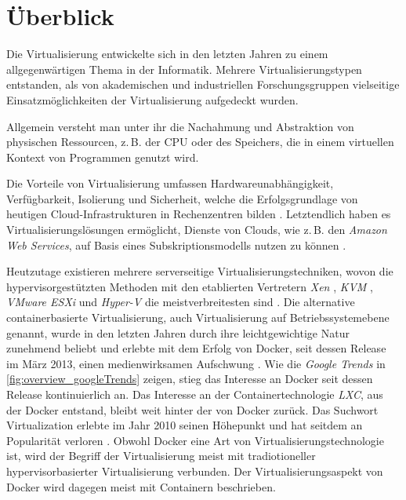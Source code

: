 \documentclass[../main.tex]{subfiles}
\begin{document}
\chapter{Überblick}
\label{overview}
  Die Virtualisierung entwickelte sich in den letzten Jahren zu einem allgegenwärtigen Thema in der Informatik. Mehrere Virtualisierungstypen entstanden, als von akademischen und industriellen Forschungsgruppen vielseitige Einsatzmöglichkeiten der Virtualisierung aufgedeckt wurden.

  Allgemein versteht man unter ihr die Nachahmung und Abstraktion von physischen Ressourcen, z.\,B. der \acrshort{CPU} oder des Speichers, die in einem virtuellen Kontext von Programmen genutzt wird.

  Die Vorteile von Virtualisierung umfassen Hardwareunabhängigkeit, Verfügbarkeit, Isolierung und Sicherheit, welche die Erfolgsgrundlage von heutigen \gls{Cloud}-Infrastrukturen in Rechenzentren bilden \cite[S.1]{containerVirtPerformance}.
  Letztendlich haben es Virtualisierungslösungen ermöglicht, Dienste von Clouds, wie z.\,B. den \emph{Amazon Web Services}\cite{amazonWebServices}, auf Basis eines Subskriptionsmodells nutzen zu können \cite[S.1]{dockerSec1}.

  Heutzutage existieren mehrere serverseitige Virtualisierungstechniken, wovon die hypervisorgestützten Methoden mit den etablierten Vertretern \emph{Xen} \cite{xen}, \emph{KVM} \cite{kvm}, \emph{VMware ESXi} \cite{vmwareESXi} und \emph{Hyper-V} \cite{hyperv} die meistverbreitesten sind \cite[S.2]{containerVirtPerformance}. Die alternative containerbasierte Virtualisierung, auch Virtualisierung auf Betriebssystemebene genannt, wurde in den letzten Jahren durch ihre leichtgewichtige Natur zunehmend beliebt und erlebte mit dem Erfolg von Docker, seit dessen Release im März 2013, einen medienwirksamen Aufschwung \cite{githubDockerChangelog}. Wie die \emph{Google Trends} in \fig \ref{fig:overview_googleTrends} zeigen, stieg das Interesse an Docker seit dessen Release kontinuierlich an. Das Interesse an der Containertechnologie \emph{\acrshort{LXC}}, aus der Docker entstand, bleibt weit hinter der von Docker zurück. Das Suchwort \glqq{}Virtualization\grqq{} erlebte im Jahr 2010 seinen Höhepunkt und hat seitdem an Popularität verloren \cite{googleTrends}. Obwohl Docker eine Art von  Virtualisierungstechnologie ist, wird der Begriff der Virtualisierung meist mit tradiotioneller hypervisorbasierter Virtualisierung verbunden. Der Virtualisierungsaspekt von Docker wird dagegen meist mit Containern beschrieben.
\end{document}
